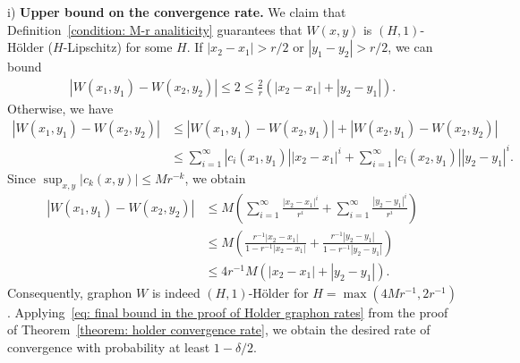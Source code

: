 \documentclass[11pt]{article}
\newcommand{\<}{\langle}
\renewcommand{\>}{\rangle}
\theoremstyle{plain}
\theoremstyle{definition}
\theoremstyle{remark}
\begin{document}
{i) \textbf{Upper bound on the convergence rate.} We claim that Definition~\ref{condition: M-r analiticity} guarantees that $W(x, y)$ is $(H, 1)$-H\"older ($H$-Lipschitz) for some $H$. If $|x_2 - x_1| > r/2$ or $|y_1 - y_2| > r/2$, we can bound
\begin{align*}
	|W(x_1, y_1) - W(x_2, y_2)| \le 2 \le \frac{2}{r} (|x_2 - x_1| + |y_2 - y_1|).
\end{align*}
Otherwise, we have
\begin{align*}
	|W(x_1, y_1) - W(x_2, y_2)| & \le |W(x_1, y_1) - W(x_2, y_1)| + |W(x_2, y_1) - W(x_2, y_2)| \\
	& \le \sum_{i = 1}^{\infty} |c_i(x_1, y_1)| |x_2 - x_1|^i + \sum_{i = 1}^{\infty} |c_i(x_2, y_1)| |y_2 - y_1|^i.
\end{align*}
Since $\sup_{x, y} |c_k(x, y)| \le M r^{-k}$, we obtain
\begin{align*}
	|W(x_1, y_1) - W(x_2, y_2)| & \le M \left ( \sum_{i = 1}^\infty \frac{|x_2 - x_1|^i}{r^i} + \sum_{i = 1}^\infty  \frac{|y_2 - y_1|^i}{r^i} \right ) \\
	& \le M \left ( \frac{r^{-1}|x_2 - x_1|}{1 - r^{-1} |x_2 - x_1|} + \frac{r^{-1}|y_2 - y_1|}{1 - r^{-1}|y_2 - y_1|} \right ) \\
	& \le 4 r^{-1} M (|x_2 - x_1| + |y_2 - y_1|).
\end{align*}
Consequently, graphon $W$ is indeed $(H, 1)$-H\"older for $H = \max(4 M r^{-1}, 2r^{-1})$. Applying~\eqref{eq: final bound in the proof of Holder graphon rates} from the proof of Theorem~\ref{theorem: holder convergence rate}, we obtain the desired rate of convergence with probability at least $1 - \delta/2$.

}
\end{document}
